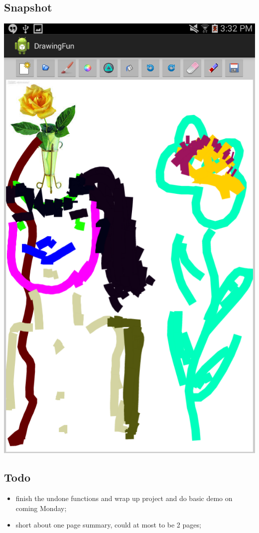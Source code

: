 \documentclass[9pt,b5paper]{article}
\begin{document}
\subsection{Snapshot}
\label{sec-5-3}
\includegraphics[width=.9\linewidth]{./Screenshot_2014-12-01-15-32-21.png}
\subsection{Todo}
\label{sec-5-4}
\begin{itemize}
\item finish the undone functions and wrap up project and do basic demo on coming Monday;
\item short about one page summary, could at most to be 2 pages;
\end{itemize}
\end{document}
